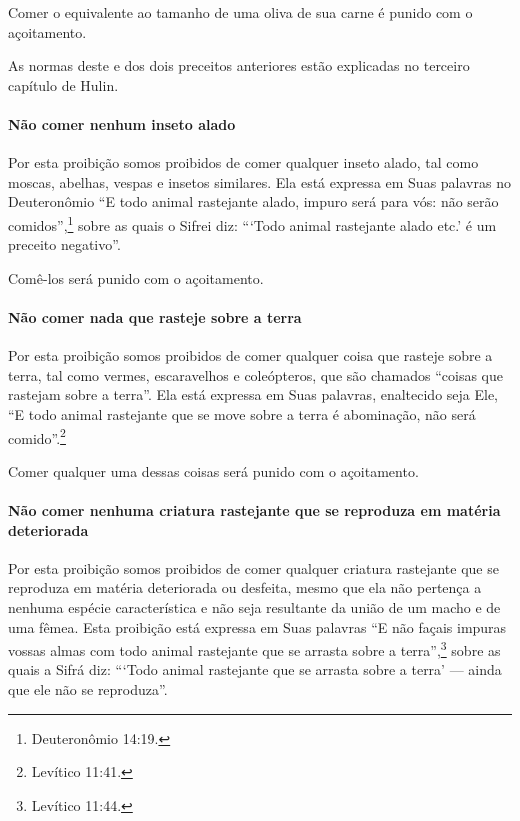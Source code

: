 Comer o equivalente ao tamanho de uma oliva de sua carne é punido com o
açoitamento.

As normas deste e dos dois preceitos anteriores estão explicadas no
terceiro capítulo de Hulin.

\paragraph{Não comer nenhum inseto alado}

Por esta proibição somos proibidos de comer qualquer inseto alado, tal
como moscas, abelhas, vespas e insetos similares. Ela está expressa em
Suas palavras no Deuteronômio ``E todo animal rastejante alado, impuro
será para vós: não serão comidos'',\footnote{Deuteronômio 14:19.} sobre as quais
o Sifrei diz: ```Todo animal rastejante alado etc.' é um preceito
negativo''.

Comê-los será punido com o açoitamento.

\paragraph{Não comer nada que rasteje sobre a terra}

Por esta proibição somos proibidos de comer qualquer coisa que rasteje
sobre a terra, tal como vermes, escaravelhos e coleópteros, que são
chamados ``coisas que rastejam sobre a terra''. Ela está expressa em
Suas palavras, enaltecido seja Ele, ``E todo animal rastejante que se
move sobre a terra é abominação, não será comido''.\footnote{Levítico 11:41.}

Comer qualquer uma dessas coisas será punido com o açoitamento.

\paragraph{Não comer nenhuma criatura rastejante que se reproduza em matéria
deteriorada}

Por esta proibição somos proibidos de comer qualquer criatura
rastejante que se reproduza em matéria deteriorada ou desfeita, mesmo
que ela não pertença a nenhuma espécie característica e não seja
resultante da união de um macho e de uma fêmea. Esta proibição está
expressa em Suas palavras
``E não façais impuras vossas almas com todo animal rastejante que se
arrasta sobre a terra'',\footnote{Levítico 11:44.} sobre as quais a Sifrá diz:
```Todo animal rastejante que se arrasta sobre a terra' --- ainda que
ele não se reproduza''.


